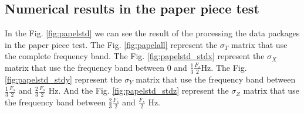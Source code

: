 \documentclass[review]{elsarticle}
\begin{document}
\subsection{Numerical results in the paper piece test} 
\label{subsec:numericalpaper}
In the Fig. \ref{fig:papelstd} we can see the result of the processing 
the data packages in the paper piece test. The Fig. \ref{fig:papelall}
represent the $\sigma_T$ matrix that use the complete frequency band.
The Fig. \ref{fig:papelstd_stdx}
represent the $\sigma_X$ matrix that use the frequency band between $0$ and $\frac{1}{3}\frac{F_s}{2}$Hz.
The Fig. \ref{fig:papelstd_stdy}
represent the $\sigma_Y$ matrix that use the frequency band between $\frac{1}{3}\frac{F_s}{2}$ and $\frac{2}{3}\frac{F_s}{2}$ Hz.
And the Fig. \ref{fig:papelstd_stdz} 
represent the $\sigma_Z$ matrix that use the frequency band between $\frac{2}{3}\frac{F_s}{2}$ and $\frac{F_s}{2}$ Hz.
\end{document}
